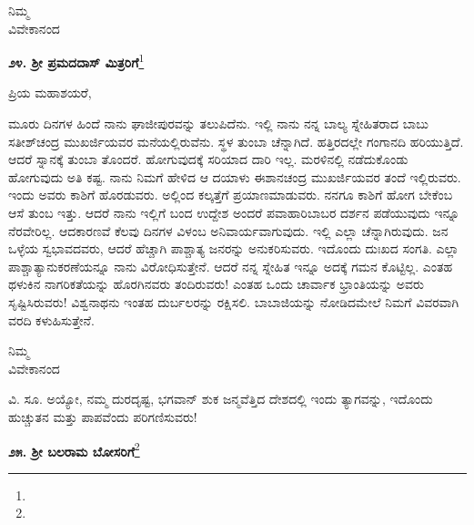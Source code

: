 {\flushright
ನಿಮ್ಮ\\ವಿವೇಕಾನಂದ\par}

\vfill\eject


\begin{center}
\textbf{೨೪. ಶ‍್ರೀ ಪ್ರಮದದಾಸ್ ಮಿತ್ರರಿಗೆ}\footnote{}
\end{center}

\vspace{-0.5cm}

\begin{flushright}
{\fontsize{10pt}{10pt}\selectfont{ಘಾಜೀಪುರ್\\[-3pt] ೨೧ನೇ ಜನವರಿ, ೧೮೯೦}}
\end{flushright}

\noindent
ಪ್ರಿಯ ಮಹಾಶಯರೆ,

ಮೂರು ದಿನಗಳ ಹಿಂದೆ ನಾನು ಘಾಜೀಪುರವನ್ನು ತಲುಪಿದೆನು. ಇಲ್ಲಿ ನಾನು ನನ್ನ ಬಾಲ್ಯ ಸ್ನೇಹಿತರಾದ ಬಾಬು ಸತೀಶ್‌ಚಂದ್ರ ಮುಖರ್ಜಿಯವರ ಮನೆಯಲ್ಲಿರುವೆನು. ಸ್ಥಳ ತುಂಬಾ ಚೆನ್ನಾಗಿದೆ. ಹತ್ತಿರದಲ್ಲೇ ಗಂಗಾನದಿ ಹರಿಯುತ್ತಿದೆ. ಆದರೆ ಸ್ನಾನಕ್ಕೆ ತುಂಬಾ ತೊಂದರೆ. ಹೋಗುವುದಕ್ಕೆ ಸರಿಯಾದ ದಾರಿ ಇಲ್ಲ. ಮರಳಿನಲ್ಲಿ ನಡೆದುಕೊಂಡು ಹೋಗುವುದು ಅತಿ ಕಷ್ಟ. ನಾನು ನಿಮಗೆ ಹೇಳಿದ ಆ ದಯಾಳು ಈಶಾನಚಂದ್ರ ಮುಖರ್ಜಿಯವರ ತಂದೆ ಇಲ್ಲಿರುವರು. ಇಂದು ಅವರು ಕಾಶಿಗೆ ಹೊರಡುವರು. ಅಲ್ಲಿಂದ ಕಲ್ಕತ್ತೆಗೆ ಪ್ರಯಾಣಮಾಡುವರು. ನನಗೂ ಕಾಶಿಗೆ ಹೋಗ ಬೇಕೆಂಬ ಆಸೆ ತುಂಬ ಇತ್ತು. ಆದರೆ ನಾನು ಇಲ್ಲಿಗೆ ಬಂದ ಉದ್ದೇಶ \enginline{-} ಅಂದರೆ ಪವಾಹಾರಿಬಾಬರ ದರ್ಶನ ಪಡೆಯುವುದು \enginline{-} ಇನ್ನೂ ನೆರವೇರಿಲ್ಲ. ಆದಕಾರಣವೆ ಕೆಲವು ದಿನಗಳ ವಿಳಂಬ ಅನಿವಾರ್ಯವಾಗುವುದು. ಇಲ್ಲಿ ಎಲ್ಲಾ ಚೆನ್ನಾಗಿರುವುದು. ಜನ ಒಳ್ಳೆಯ ಸ್ವಭಾವದವರು, ಆದರೆ ಹೆಚ್ಚಾಗಿ ಪಾಶ್ಚಾತ್ಯ ಜನರನ್ನು ಅನುಕರಿಸುವರು. ಇದೊಂದು ದುಃಖದ ಸಂಗತಿ. ಎಲ್ಲಾ ಪಾಶ್ಚಾತ್ಯಾನುಕರಣೆಯನ್ನೂ ನಾನು ವಿರೋಧಿಸುತ್ತೇನೆ. ಆದರೆ ನನ್ನ ಸ್ನೇಹಿತ ಇನ್ನೂ ಅದಕ್ಕೆ ಗಮನ ಕೊಟ್ಟಿಲ್ಲ. ಎಂತಹ ಥಳುಕಿನ ನಾಗರಿಕತೆಯನ್ನು ಹೊರಗಿನವರು ತಂದಿರುವರು! ಎಂತಹ ಒಂದು ಚಾರ್ವಾಕ ಭ್ರಾಂತಿಯನ್ನು ಅವರು ಸೃಷ್ಟಿಸಿರುವರು! ವಿಶ್ವನಾಥನು ಇಂತಹ ದುರ್ಬಲರನ್ನು ರಕ್ಷಿಸಲಿ. ಬಾಬಾಜಿಯನ್ನು ನೋಡಿದಮೇಲೆ ನಿಮಗೆ ವಿವರವಾಗಿ ವರದಿ ಕಳುಹಿಸುತ್ತೇನೆ.

\vspace{-0.5cm}

{\flushright
ನಿಮ್ಮ\\ವಿವೇಕಾನಂದ\par}

ವಿ. ಸೂ. \enginline{-} ಅಯ್ಯೋ, ನಮ್ಮ ದುರದೃಷ್ಟ, ಭಗವಾನ್ ಶುಕ ಜನ್ಮವೆತ್ತಿದ ದೇಶದಲ್ಲಿ ಇಂದು ತ್ಯಾಗವನ್ನು, ಇದೊಂದು ಹುಚ್ಚುತನ ಮತ್ತು ಪಾಪವೆಂದು ಪರಿಗಣಿಸುವರು!

\vspace{-0.25cm}

\begin{center}
\textbf{೨೫. ಶ‍್ರೀ ಬಲರಾಮ ಬೋಸರಿಗೆ}\footnote{}
\end{center}

